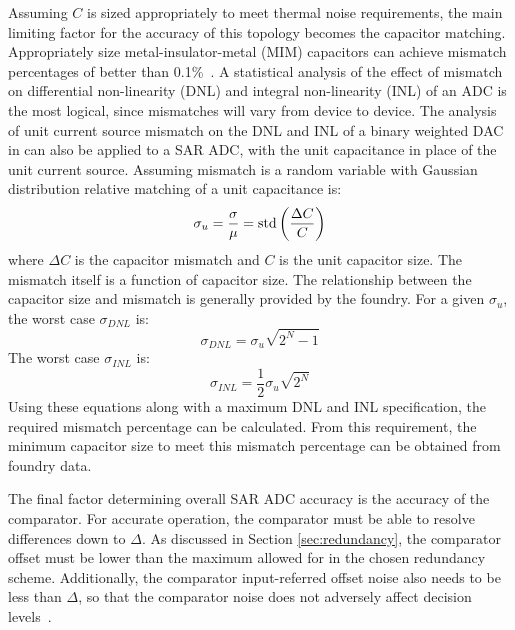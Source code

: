 Assuming $C$ is sized appropriately to meet thermal noise requirements, the main limiting factor for the accuracy of this topology becomes the capacitor matching. Appropriately size metal-insulator-metal (MIM) capacitors can achieve mismatch percentages of better than 0.1\%~\cite{1297341}. A statistical analysis of the effect of mismatch on differential non-linearity (DNL) and integral non-linearity (INL) of an ADC is the most logical, since mismatches will vary from device to device. The analysis of unit current source mismatch on the DNL and INL of a binary weighted DAC in \cite{315breader} can also be applied to a SAR ADC, with the unit capacitance in place of the unit current source. Assuming mismatch is a random variable with Gaussian distribution relative matching of a unit capacitance is:
\begin{equation}
\label{eq:caprelmatching}
\sigma_{u} = \frac{\sigma}{\mu} = \textnormal{std}\left( \frac{\Delta C}{C}\right)
\end{equation}
where $\Delta C$ is the capacitor mismatch and $C$ is the unit capacitor size. The mismatch itself is a function of capacitor size. The relationship between the capacitor size and mismatch is generally provided by the foundry. For a given $\sigma_{u}$, the worst case $\sigma_{DNL}$ is:
\begin{equation}
\label{eq:sigmadnl}
\sigma_{DNL} = \sigma_{u} \sqrt{2^N-1}
\end{equation}
The worst case $\sigma_{INL}$ is:
\begin{equation}
\label{eq:sigmainl}
\sigma_{INL} = \dfrac{1}{2} \sigma_{u} \sqrt{2^{N}}
\end{equation}
Using these equations along with a maximum DNL and INL specification, the required mismatch percentage can be calculated. From this requirement, the minimum capacitor size to meet this mismatch percentage can be obtained from foundry data.

The final factor determining overall SAR ADC accuracy is the accuracy of the comparator. For accurate operation, the comparator must be able to resolve differences down to $\Delta$. As discussed in Section \ref{sec:redundancy}, the comparator offset must be lower than the maximum allowed for in the chosen redundancy scheme. Additionally, the comparator input-referred offset noise also needs to be less than $\Delta$, so that the comparator noise does not adversely affect decision levels~\cite{maximsaradc}. 
